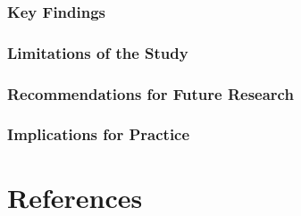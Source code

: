\documentclass[]{book}
\theoremstyle{definition}
\theoremstyle{definition}
\theoremstyle{definition}
\theoremstyle{remark}
\begin{document}
\subsection{Key Findings}\label{key-findings}

\subsection{Limitations of the Study}\label{limitations-of-the-study}

\subsection{Recommendations for Future
Research}\label{recommendations-for-future-research}

\subsection{Implications for Practice}\label{implications-for-practice}

\chapter{References}\label{references}
\end{document}
